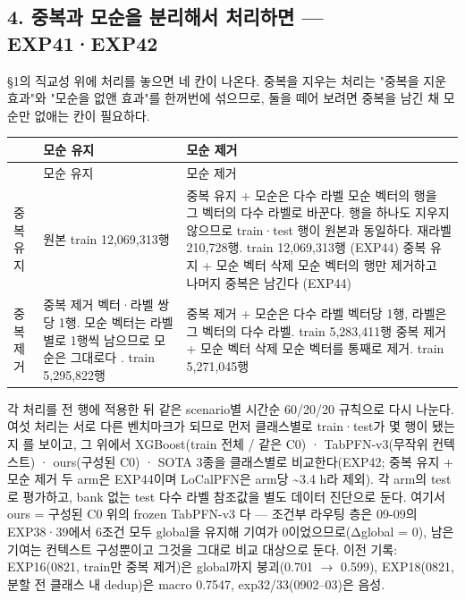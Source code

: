 \subsection*{4. 중복과 모순을 분리해서 처리하면 — EXP41·EXP42}
§1의 직교성 위에 처리를 놓으면 네 칸이 나온다. 중복을 지우는 처리는 "중복을 지운 효과"와 "모순을 없앤 효과"를 한꺼번에 섞으므로, 둘을 떼어 보려면 중복을 남긴 채 모순만 없애는 칸이 필요하다.

\begingroup
\footnotesize
\begin{longtable}{>{\raggedright\arraybackslash}p{}>{\raggedright\arraybackslash}p{}>{\raggedright\arraybackslash}p{}}
\toprule
 & 모순 유지 & 모순 제거 \\ \midrule
\endfirsthead
 & 모순 유지 & 모순 제거 \\ \midrule
\endhead
{}중복 유지 & 원본 train 12,069,313행 & 중복 유지 +\allowbreak{} 모순은 다수 라벨 모순 벡터의 행을 그 벡터의 다수 라벨로 바꾼다. 행을 하나도 지우지 않으므로 train·test 행이 원본과 동일하다. 재라벨 210,728행. train 12,069,313행 (EXP44) 중복 유지 +\allowbreak{} 모순 벡터 삭제 모순 벡터의 행만 제거하고 나머지 중복은 남긴다 (EXP44) \\
{}중복 제거 & 중복 제거 벡터·라벨 쌍당 1행. 모순 벡터는 라벨별로 1행씩 남으므로 모순은 그대로다 . train 5,295,822행 & 중복 제거 +\allowbreak{} 모순은 다수 라벨 벡터당 1행, 라벨은 그 벡터의 다수 라벨. train 5,283,411행 중복 제거 +\allowbreak{} 모순 벡터 삭제 모순 벡터를 통째로 제거. train 5,271,045행 \\
\bottomrule
\end{longtable}
\endgroup
각 처리를 전 행에 적용한 뒤 같은 scenario별 시간순 60/\allowbreak{}20/\allowbreak{}20 규칙으로 다시 나눈다. 여섯 처리는 서로 다른 벤치마크가 되므로 먼저 클래스별로 train·test가 몇 행이 됐는지 를 보이고, 그 위에서 XGBoost(train 전체 /\allowbreak{} 같은 C0) · TabPFN-v3(무작위 컨텍스트) · ours(구성된 C0) · SOTA 3종을 클래스별로 비교한다(EXP42; 중복 유지 +\allowbreak{} 모순 제거 두 arm은 EXP44이며 LoCalPFN은 arm당 \textasciitilde{}3.4 h라 제외). 각 arm의 test로 평가하고, bank 없는 test 다수 라벨 참조값을 별도 데이터 진단으로 둔다. 여기서 ours =\allowbreak{} 구성된 C0 위의 frozen TabPFN-v3 다 — 조건부 라우팅 층은 09-09의 EXP38·39에서 6조건 모두 global을 유지해 기여가 0이었으므로(Δglobal =\allowbreak{} 0), 남은 기여는 컨텍스트 구성뿐이고 그것을 그대로 비교 대상으로 둔다. 이전 기록: EXP16(0821, train만 중복 제거)은 global까지 붕괴(0.701 \ensuremath{\rightarrow} 0.599), EXP18(0821, 분할 전 클래스 내 dedup)은 macro 0.7547, exp32/\allowbreak{}33(0902–03)은 음성.


